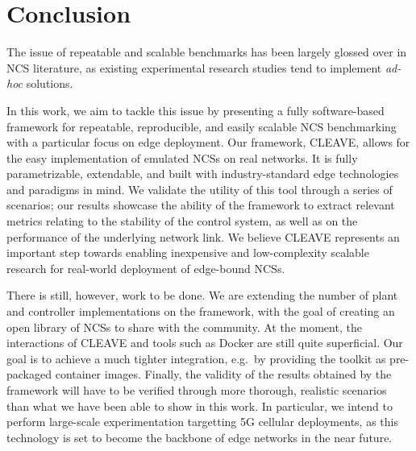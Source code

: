 \section{Conclusion}\label{sec:conclusion}

The issue of repeatable and scalable benchmarks has been largely glossed over in \ac{NCS} literature, as existing experimental research studies tend to implement \emph{ad-hoc} solutions.

In this work, we aim to tackle this issue by presenting a fully software-based framework for repeatable, reproducible, and easily scalable \ac{NCS} benchmarking with a particular focus on edge deployment.
Our framework, \ac{CLEAVE}, allows for the easy implementation of emulated \acp{NCS} on real networks.
It is fully parametrizable, extendable, and built with industry-standard edge technologies and paradigms in mind.
We validate the utility of this tool through a series of scenarios; our results showcase the ability of the framework to extract relevant metrics relating to the stability of the control system, as well as on the performance of the underlying network link.
We believe \ac{CLEAVE} represents an important step towards enabling inexpensive and low-complexity scalable research for real-world deployment of edge-bound \acp{NCS}.

There is still, however, work to be done.
We are extending the number of plant and controller implementations on the framework, with the goal of creating an open library of \acp{NCS} to share with the community.
At the moment, the interactions of \ac{CLEAVE} and tools such as Docker are still quite superficial.
Our goal is to achieve a much tighter integration, e.g.\ by providing the toolkit as pre-packaged container images.
Finally, the validity of the results obtained by the framework will have to be verified through more thorough, realistic scenarios than what we have been able to show in this work.
In particular, we intend to perform large-scale experimentation targetting 5G cellular deployments, as this technology is set to become the backbone of edge networks in the near future.

